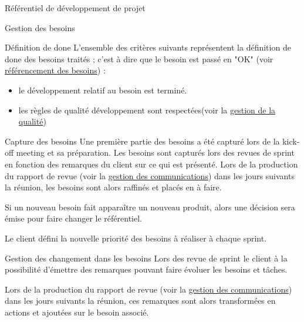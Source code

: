 \documentclass[]{article}
\begin{document}
{\begin{section}{\label{sec:Référentiel de développement de projet}Référentiel de développement de projet}
\begin{subsection}{\label{sec:Gestion des besoins}Gestion des besoins}
        \begin{subsubsection}{\label{sec:Définition de done}Définition de done}
            L'ensemble des critères suivants représentent la définition de done des besoins traités ; c'est à dire que le besoin est passé en "OK" (voir \hyperref[sec:Référencement des besoins]{référencement des besoins}) : 
            \begin{itemize}
                \item le développement relatif au besoin est terminé.
                \item les règles de qualité développement sont respectées(voir la \hyperref[sec:Gestion de la qualité]{gestion de la qualité})
            \end{itemize}
        \end{subsubsection}

         \begin{subsubsection}{\label{sec:Capture des besoins}Capture des besoins}
             Une première partie des besoins a été capturé lors de la kick-off meeting et sa préparation.
             Les besoins sont capturés lors des revues de sprint en fonction des remarques du client sur ce qui est présenté. Lors de la production du rapport de revue (voir la \hyperref[sec:Gestion de la communication]{gestion des communications}) dans les jours suivants la réunion, les besoins sont alors raffinés et placés en à faire.

             Si un nouveau besoin fait apparaître un nouveau produit, alors une décision sera émise pour faire changer le référentiel.

             Le client défini la nouvelle priorité des besoins à réaliser à chaque sprint.
         \end{subsubsection}

         \begin{subsubsection}{\label{sec:Gestion des changement dans les besoins}Gestion des changement dans les besoins}
             Lors des revue de sprint le client à la possibilité d’émettre des remarques pouvant faire évoluer les besoins et tâches.

             Lors de la production du rapport de revue (voir la \hyperref[sec:Gestion de la communication]{gestion des communications}) dans les jours suivants la réunion, ces remarques sont alors transformées en actions et ajoutées sur le besoin associé.
         \end{subsubsection}
     \end{subsection}


\end{section}}
\end{document}
